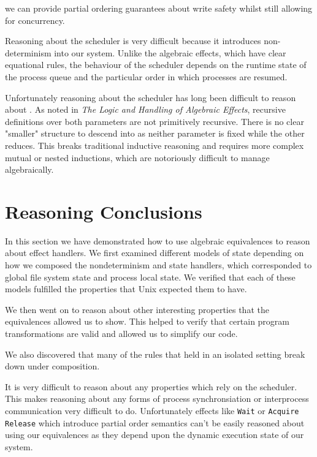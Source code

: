 \documentclass[logo,bsc,singlespacing,parskip]{infthesis}
\begin{document}
we can provide partial ordering guarantees about write safety whilst still allowing for concurrency.


Reasoning about the scheduler is very difficult because it introduces non-determinism into our system. Unlike the algebraic effects, which have clear equational rules, the behaviour of the scheduler depends on the runtime state of the process queue and the particular order in which processes are resumed. 

Unfortunately reasoning about the scheduler has long been difficult to reason about \cite{}. As noted in \textit{The Logic and Handling of Algebraic Effects}, recursive definitions over both parameters are not primitively recursive. There is no clear "smaller" structure to descend into as neither parameter is fixed while the other reduces. This breaks traditional inductive reasoning and requires more complex mutual or nested inductions, which are notoriously difficult to manage algebraically.






\section{Reasoning Conclusions}

In this section we have demonstrated how to use algebraic equivalences to reason about effect handlers. We first examined different models of state depending on how we composed the nondeterminism and state handlers, which corresponded to global file system state and process local state. We verified that each of these models fulfilled the properties that Unix expected them to have. 

We then went on to reason about other interesting properties that the equivalences allowed us to show. This helped to verify that certain program transformations are valid and allowed us to simplify our code. 

We also discovered that many of the rules that held in an isolated setting break down under composition. 

It is very difficult to reason about any properties which rely on the scheduler. This makes reasoning about any forms of process synchronsiation or interprocess communication very difficult to do. Unfortunately effects like \lstinline{Wait} or \lstinline{Acquire} \lstinline{Release} which introduce partial order semantics can't be easily reasoned about using our equivalences as they depend upon the dynamic execution state of our system.
\end{document}
